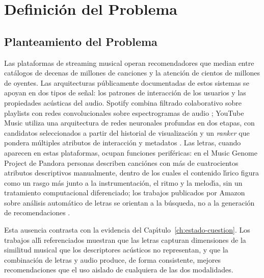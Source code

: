 \chapter{Definici\'{o}n del Problema}
\label{ch:definicion-problema}

\section{Planteamiento del Problema}
\label{sec:planteamiento}

Las plataformas de streaming musical operan recomendadores que median entre cat\'{a}logos de decenas de millones de canciones y la atenci\'{o}n de cientos de millones de oyentes. Las arquitecturas p\'{u}blicamente documentadas de estos sistemas se apoyan en dos tipos de se\~{n}al: los patrones de interacci\'{o}n de los usuarios y las propiedades ac\'{u}sticas del audio. Spotify combina filtrado colaborativo sobre playlists con redes convolucionales sobre espectrogramas de audio \parencite{schedl_2018_challenges_mrs}; YouTube Music utiliza una arquitectura de redes neuronales profundas en dos etapas, con candidatos seleccionados a partir del historial de visualizaci\'{o}n y un \textit{ranker} que pondera m\'{u}ltiples atributos de interacci\'{o}n y metadatos \parencite{covington_2016_youtube_dnn}. Las letras, cuando aparecen en estas plataformas, ocupan funciones perif\'{e}ricas: en el Music Genome Project de Pandora personas describen canciónes con m\'{a}s de cuatrocientos atributos descriptivos manualmente, dentro de los cuales el contenido l\'{\i}rico figura como un rasgo m\'{a}s junto a la instrumentaci\'{o}n, el ritmo y la melod\'{\i}a, sin un tratamiento computacional diferenciado; los trabajos publicados por Amazon sobre an\'{a}lisis autom\'{a}tico de letras se orientan a la b\'{u}squeda, no a la generaci\'{o}n de recomendaciones \parencite{sundaramoorthy_2024_lyriclure}.

Esta ausencia contrasta con la evidencia del Cap\'{\i}tulo~\ref{ch:estado-cuestion}. Los trabajos all\'{\i} referenciados muestran que las letras capturan dimensiones de la similitud musical que los descriptores ac\'{u}sticos no representan, y que la combinaci\'{o}n de letras y audio produce, de forma consistente, mejores recomendaciones que el uso aislado de cualquiera de las dos modalidades.

